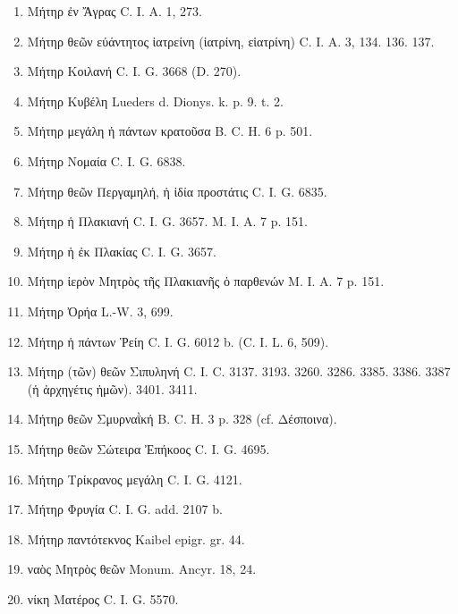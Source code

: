 \documentclass[a4paper, 11pt, oneside, polutonikogreek, german]{article}
\begin{document}
\begin{enumerate}
\item Μήτηρ ἐν Ἄγρας C. I. A. 1, 273.

\item Μήτηρ θεῶν εὐάντητος ἰατρείνη (ἰατρίνη, εἱατρίνη) C. I. A. 3, 134. 136. 137.

\item Μήτηρ Κοιλανή C. I. G. 3668 (D. 270).

\item Μήτηρ Κυβέλη Lueders d. Dionys. k. p. 9. t. 2.

\item Μήτηρ μεγάλη ἡ πάντων κρατοῦσα B. C. H. 6 p. 501.

\item Μήτηρ Νομαία C. I. G. 6838.

\item Μήτηρ θεῶν Περγαμηλή, ἡ ἰδία προστάτις C. I. G. 6835.

\item Μήτηρ ἡ Πλακιανή C. I. G. 3657. M. I. A. 7 p. 151.

\item Μήτηρ ἡ ἐκ Πλακίας C. I. G. 3657.

\item Μήτηρ ἱερὸν Μητρὸς τῆς Πλακιανῆς ὁ παρθενών M. I. A. 7 p. 151.

\item Μήτηρ Ὀρήα L.-W. 3, 699.

\item Μήτηρ ἡ πάντων Ῥείη C. I. G. 6012 b. (C. I. L. 6, 509).

\item Μήτηρ (τῶν) θεῶν Σιπυληνή C. I. C. 3137. 3193. 3260. 3286. 3385. 3386. 3387 (ἡ ἀρχηγέτις ἡμῶν). 3401. 3411.

\item Μήτηρ θεῶν Σμυρναῒκή B. C. H. 3 p. 328 (cf. Δέσποινα).

\item Μήτηρ θεῶν Σώτειρα Ἐπήκοος C. I. G. 4695.

\item Μήτηρ Τρίκρανος μεγάλη C. I. G. 4121.

\item Μήτηρ Φρυγία C. I. G. add. 2107 b.

\item Μήτηρ παντότεκνος Kaibel epigr. gr. 44.

\item ναὸς Μητρὸς θεῶν Monum. Ancyr. 18, 24.

\item νίκη Ματέρος C. I. G. 5570.


\end{enumerate}
\end{document}
